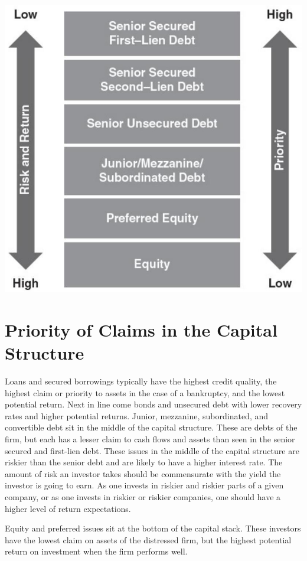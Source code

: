 \documentclass[11pt]{article}
\begin{document}
\begin{center}
\includegraphics[max width=\textwidth]{2024_04_10_a4f1ca289b861eaba170g-5}
\end{center}

\section*{Priority of Claims in the Capital Structure}
Loans and secured borrowings typically have the highest credit quality, the highest claim or priority to assets in the case of a bankruptcy, and the lowest potential return. Next in line come bonds and unsecured debt with lower recovery rates and higher potential returns. Junior, mezzanine, subordinated, and convertible debt sit in the middle of the capital structure. These are debts of the firm, but each has a lesser claim to cash flows and assets than seen in the senior secured and first-lien debt. These issues in the middle of the capital structure are riskier than the senior debt and are likely to have a higher interest rate. The amount of risk an investor takes should be commensurate with the yield the investor is going to earn. As one invests in riskier and riskier parts of a given company, or as one invests in riskier or riskier companies, one should have a higher level of return expectations.

Equity and preferred issues sit at the bottom of the capital stack. These investors have the lowest claim on assets of the distressed firm, but the highest potential return on investment when the firm performs well.
\end{document}
